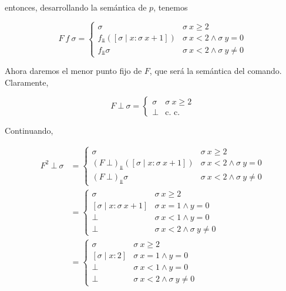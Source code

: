 \documentclass[article, 12pt]{article}
\begin{document}
entonces, desarrollando la semántica de $p$, tenemos 

\begin{equation*}
  F ~ f ~ \sigma = \begin{cases}
    \sigma & \sigma ~ x \geq 2 \\ 
    f_{\Bot} \left( [\sigma \mid x : \sigma ~ x + 1] \right)  & \sigma ~ x < 2
    \land \sigma ~ y = 0 \\
    f_{\Bot} \sigma  & \sigma ~ x < 2 \land \sigma ~ y \neq 0
  \end{cases}
\end{equation*}

Ahora daremos el menor punto fijo de $F$, que será la semántica del comando.
Claramente, 

\begin{equation*}
  F ~ \bot ~ \sigma = \begin{cases}
    \sigma & \sigma ~ x \geq 2 \\ 
    \bot & \text{c. c.}
  \end{cases}
\end{equation*}

Continuando,

\begin{align*}
  F^2 ~ \bot  ~ \sigma 
  &= \begin{cases}
    \sigma & \sigma ~ x \geq 2 \\ 
    (F ~ \bot )_{\Bot} \left( [\sigma \mid x : \sigma ~ x + 1] \right)  & \sigma ~ x < 2
    \land \sigma ~ y = 0 \\
    (F ~ \bot )_{\Bot} \sigma  & \sigma ~ x < 2 \land \sigma ~ y \neq 0
  \end{cases} \\ 
  &= \begin{cases}
    \sigma & \sigma ~ x \geq 2 \\ 
    [\sigma \mid x : \sigma ~ x + 1] & \sigma ~ x = 1 \land  y = 0 \\ 
    \bot  & \sigma ~ x < 1 \land  y = 0 \\ 
    \bot & \sigma ~ x <2 \land  \sigma ~  y \neq 0
  \end{cases}\\
  &= \begin{cases}
    \sigma & \sigma ~ x \geq 2 \\ 
    [\sigma \mid x : 2] & \sigma ~ x = 1 \land  y = 0 \\ 
    \bot  & \sigma ~ x < 1 \land  y = 0 \\ 
    \bot & \sigma ~ x <2 \land  \sigma ~  y \neq 0
  \end{cases}
\end{align*}
\end{document}
